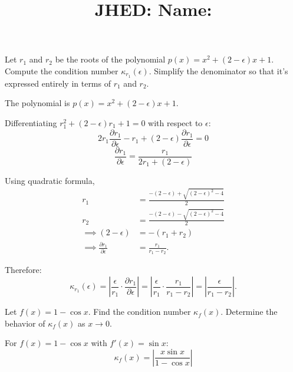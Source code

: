\documentclass[reqno, answers]{exam}
\title{\normalsize{
  JHED: \underline{\hspace{4cm}} \hspace{1em} Name: \underline{\hspace{9cm}}}
   }
\author{}
\date{}
\begin{document}
\maketitle
\vspace{-2cm} %

\begin{questions}

  \question
  Let $r_1$ and $r_2$ be the roots of the polynomial $p(x) = x^2 + (2 - \epsilon)x + 1$. Compute the condition number $\kappa_{r_1}(\epsilon)$. Simplify the denominator so that it's expressed entirely in terms of $r_1$ and $r_2$.

  \begin{solution}
    The polynomial is $p(x) = x^2 + (2 - \epsilon)x + 1$.

    Differentiating $r_1^2 + (2 - \epsilon)r_1 + 1 = 0$ with respect to $\epsilon$:
    $$2r_1\frac{\partial r_1}{\partial \epsilon} - r_1 + (2 - \epsilon)\frac{\partial r_1}{\partial \epsilon} = 0$$
    $$\frac{\partial r_1}{\partial \epsilon} = \frac{r_1}{2r_1 + (2 - \epsilon)}$$

    Using quadratic formula,
    \begin{align*}
      r_1                                             & = \frac{-(2 - \epsilon) + \sqrt{(2 - \epsilon)^2 - 4}}{2} \\
      r_2                                             & = \frac{-(2 - \epsilon) - \sqrt{(2 - \epsilon)^2 - 4}}{2} \\
      \implies
      (2 - \epsilon)                                  & = -(r_1 + r_2)                                            \\
      \implies \frac{\partial r_1}{\partial \epsilon} & = \frac{r_1}{r_1 - r_2}.
    \end{align*}


    Therefore:
    $$\kappa_{r_1}(\epsilon) = \left|\frac{\epsilon}{r_1} \cdot \frac{\partial r_1}{\partial \epsilon}\right| = \left|\frac{\epsilon}{r_1} \cdot \frac{r_1}{r_1-r_2}\right| = \left|\frac{\epsilon}{r_1-r_2}\right|.$$
  \end{solution}

  \newpage
  \question Let $f(x) = 1 - \cos x$. Find the condition number $\kappa_f(x)$. Determine the behavior of $\kappa_f(x)$ as $x \to 0$.
  \begin{solution}
    For $f(x) = 1 - \cos x$ with $f'(x) = \sin x$:
    $$\kappa_f(x) = \left|\frac{x \sin x}{1 - \cos x}\right|$$


\end{solution}
\end{questions}
\end{document}
